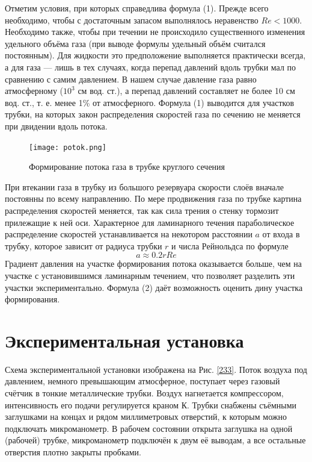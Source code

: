 \documentclass[a4paper,12pt]{article} %
\begin{document}
Отметим условия, при которых справедлива формула (1). Прежде всего необходимо, чтобы с достаточным запасом выполнялось неравенство $Re < 1000$. Необходимо также, чтобы при течении не происходило существенного изменения удельного объёма газа (при выводе формулы удельный объём считался постоянным). Для жидкости это предположение выполняется практически всегда, а для газа --- лишь в тех случаях, когда перепад давлений вдоль трубки мал по сравнению с самим давлением. В нашем случае давление газа равно атмосферному ($10^3$ см вод. ст.), а перепад давлений составляет не более 10 см вод. ст., т. е. менее 1\% от атмосферного. Формула (1) выводится для участков трубки, на которых закон распределения скоростей газа по сечению не меняется при двидении вдоль потока.
\begin{figure}[H]
\center
\texttt{[image: potok.png]}
\caption{Формирование потока газа в трубке круглого сечения}
\end{figure}
При втекании газа в трубку из большого резервуара скорости слоёв вначале постоянны по всему направлению. По мере продвижения газа по трубке картина распределения скоростей меняется, так как сила трения о стенку тормозит прилежащие к ней оси. Характерное для ламинарного течения параболическое распределение скоростей устанавливается на некотором расстоянии $a$ от входа в трубку, которое зависит от радиуса трубки $r$ и числа Рейнольдса по формуле 
\begin{equation}
	a \approx 0.2rRe
\end{equation}
Градиент давления на участке формирования потока оказывается больше, чем на участке с установившимся ламинарным течением, что позволяет разделить эти участки экспериментально. Формула (2) даёт возможность оценить дину участка формирования.

\section{Экспериментальная установка}

Схема экспериментальной установки изображена на Рис. \ref{233}. Поток воздуха
под давлением, немного превышающим атмосферное, поступает через газовый счётчик в тонкие металлические трубки. Воздух нагнетается компрессором, интенсивность его подачи регулируется краном К. Трубки снабжены
съёмными заглушками на концах и рядом миллиметровых отверстий, к которым можно подключать микроманометр. В рабочем состоянии открыта заглушка на одной (рабочей) трубке, микроманометр подключён к двум её выводам, а все остальные отверстия плотно закрыты пробками.
\end{document}

